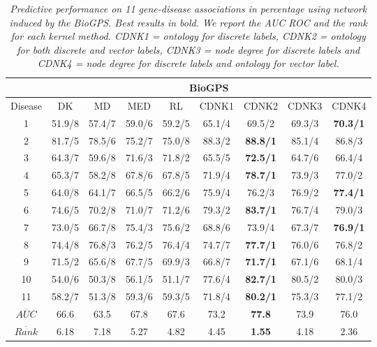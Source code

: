 \begin{table}
\caption{\textit {Predictive performance on 11 gene-disease associations in percentage using network induced by the BioGPS. Best results in bold. We report the AUC ROC and the rank for each kernel method.  CDNK1 = ontology for discrete labels, CDNK2 = ontology for both discrete and vector labels, CDNK3 = node degree for discrete labels and CDNK4 = node degree for discrete labels and ontology for vector label.}}
\vspace*{5pt}
\centering
\setlength{\tabcolsep}{1mm}
\begin{tabular}{|c|c|c|c|c|c|c|c|c|}
\hline
         & \multicolumn{8}{c|}{\textbf{BioGPS}}\\
 \hline
Disease & DK & MD & MED & RL & CDNK1 & CDNK2 & CDNK3 & CDNK4\\

 \hline
1 & 51.9/8 & 57.4/7 & 59.0/6 & 59.2/5 & 65.1/4 & 69.5/2 & 69.3/3 & \textbf{70.3/1} \\
2 & 81.7/5 & 78.5/6 & 75.2/7 & 75.0/8 & 88.3/2 & \textbf{88.8/1} & 85.1/4 & 86.8/3 \\
3 & 64.3/7 & 59.6/8 & 71.6/3 & 71.8/2 & 65.5/5 & \textbf{72.5/1} & 64.7/6 & 66.4/4 \\
4 & 65.3/7 & 58.2/8 & 67.8/6 & 67.8/5 & 71.9/4 & \textbf{78.7/1} & 73.9/3 & 77.0/2 \\
5 & 64.0/8 & 64.1/7 & 66.5/5 & 66.2/6 & 75.9/4 & 76.2/3 & 76.9/2 & \textbf{77.4/1} \\
6 & 74.6/5 & 70.2/8 & 71.0/7 & 71.2/6 & 79.3/2 & \textbf{83.7/1} & 76.7/4 & 79.0/3 \\
7 & 73.0/5 & 66.7/8 & 75.4/3 & 75.6/2 & 68.8/6 & 73.9/4 & 67.3/7 & \textbf{76.9/1} \\
8 & 74.4/8 & 76.8/3 & 76.2/5 & 76.4/4 & 74.7/7 & \textbf{77.7/1} & 76.0/6 & 76.8/2 \\
9 & 71.5/2 & 65.6/8 & 67.7/5 & 69.9/3 & 66.8/7 & \textbf{71.7/1} & 67.1/6 & 68.1/4 \\
10 & 54.0/6 & 50.3/8 & 56.1/5 & 51.1/7 & 77.6/4 & \textbf{82.7/1} & 80.5/2 & 80.0/3 \\
11 & 58.2/7 & 51.3/8 & 59.3/6 & 59.3/5 & 71.8/4 & \textbf{80.2/1} & 75.3/3 & 77.1/2 \\
\hline
$\overline{AUC}$ & 66.6 & 63.5 & 67.8 & 67.6 & 73.2 & \textbf{77.8} & 73.9 & 76.0 \\
$\overline{Rank}$ & 	6.18 & 7.18 & 5.27 & 4.82 & 4.45 & \textbf{1.55} & 4.18 & 2.36 \\
 \hline 
\end{tabular}
\label{table_biogps}
\end{table}
